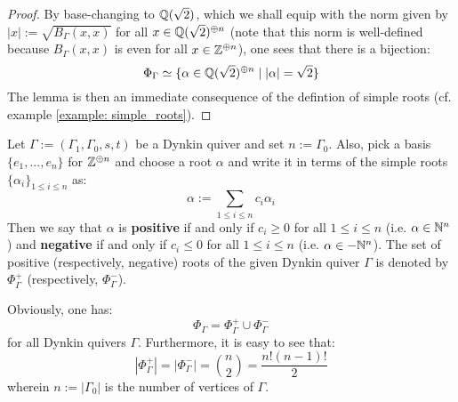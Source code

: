                 \begin{proof}
                    By base-changing to $\mathbb{Q}(\sqrt{2})$, which we shall equip with the norm given by $|x| := \sqrt{B_{\Gamma}(x, x)}$ for all $x \in \mathbb{Q}(\sqrt{2})^{\oplus n}$ (note that this norm is well-defined because $B_{\Gamma}(x, x)$ is even for all $x \in \mathbb{Z}^{\oplus n}$), one sees that there is a bijection:
                        $$\Phi_{\Gamma} \simeq \{\alpha \in \mathbb{Q}(\sqrt{2})^{\oplus n} \mid |\alpha| = \sqrt{2}\}$$
                    The lemma is then an immediate consequence of the defintion of simple roots (cf. example \ref{example: simple_roots}).
                \end{proof}
            \begin{definition} \label{def: negative_and_positive_roots}
                Let $\Gamma := (\Gamma_1, \Gamma_0, s, t)$ be a Dynkin quiver and set $n := \Gamma_0$. Also, pick a basis $\{e_1, ..., e_n\}$ for $\mathbb{Z}^{\oplus n}$ and choose a root $\alpha$ and write it in terms of the simple roots $\{\alpha_i\}_{1 \leq i \leq n}$ as:
                    $$\alpha := \sum_{1 \leq i \leq n} c_i \alpha_i$$
                Then we say that $\alpha$ is \textbf{positive} if and only if $c_i \geq 0$ for all $1 \leq i \leq n$ (i.e. $\alpha \in \mathbb{N}^n$) and \textbf{negative} if and only if $c_i \leq 0$ for all $1 \leq i \leq n$ (i.e. $\alpha \in -\mathbb{N}^n$). The set of positive (respectively, negative) roots of the given Dynkin quiver $\Gamma$ is denoted by $\Phi_{\Gamma}^+$ (respectively, $\Phi_{\Gamma}^-$).
            \end{definition}
            \begin{remark} \label{remark: number_of_positive_roots_of_dynkin_quivers}
                Obviously, one has:
                    $$\Phi_{\Gamma} = \Phi_{\Gamma}^+ \cup \Phi_{\Gamma}^-$$
                for all Dynkin quivers $\Gamma$. Furthermore, it is easy to see that:
                    $$|\Phi_{\Gamma}^+| = |\Phi_{\Gamma}^-| = \binom{n}{2} = \frac{n!(n - 1)!}{2}$$
                wherein $n := |\Gamma_0|$ is the number of vertices of $\Gamma$.
            \end{remark}
            
